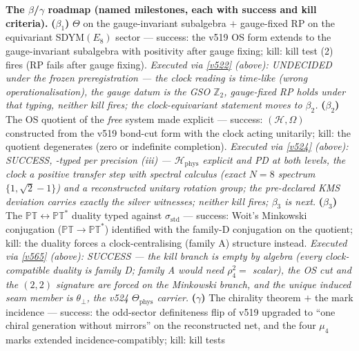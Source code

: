 \documentclass[11pt,a4paper]{article}
\newcommand{\Z}{\mathbb Z}
\begin{document}
\par\smallskip\noindent\textbf{The $\beta$/$\gamma$ roadmap (named milestones, each with success
and kill criteria).}
\textbf{($\beta_1$)} $\Theta$ on the gauge-invariant subalgebra $+$ gauge-fixed RP on the
equivariant SDYM$(E_8)$ sector --- success: the v519 OS form extends to the gauge-invariant
subalgebra with positivity after gauge fixing; kill: kill test (2) fires (RP fails after gauge
fixing). \emph{Executed via \vref{v522} (above): UNDECIDED under the frozen preregistration ---
the clock reading is time-like (wrong operationalisation), the gauge datum is the GSO $\Z_2$,
gauge-fixed RP holds under that typing, neither kill fires; the clock-equivariant statement
moves to $\beta_2$.}
\textbf{($\beta_2$)} The OS quotient of the \emph{free} system made explicit --- success:
$(\mathcal H,\Omega)$ constructed from the v519 bond-cut form with the clock acting unitarily;
kill: the quotient degenerates (zero or indefinite completion). \emph{Executed via
\vref{v524} (above): SUCCESS, \mC-typed per precision (iii) --- $\mathcal H_{\mathrm{phys}}$
explicit and PD at both levels, the clock a positive transfer step with spectral calculus
(exact $N = 8$ spectrum $\{1, \sqrt2-1\}$) and a reconstructed unitary rotation group; the
pre-declared KMS deviation carries exactly the silver witnesses; neither kill fires;
$\beta_3$ is next.}
\textbf{($\beta_3$)} The $\mathbb{PT}\leftrightarrow\mathbb{PT}^*$ duality typed against
$\sigma_{\mathrm{std}}$ --- success: Woit's Minkowski conjugation ($\mathbb{PT}\to\mathbb{PT}^*$)
identified with the family-D conjugation on the quotient; kill: the duality forces a
clock-centralising (family A) structure instead. \emph{Executed via \vref{v565} (above):
SUCCESS --- the kill branch is empty by algebra (every clock-compatible duality is family D;
family A would need $\rho_4^2=$ scalar), the OS cut and the $(2,2)$ signature are forced on
the Minkowski branch, and the unique induced seam member is $\theta_\perp$, the v524
$\Theta_{\mathrm{phys}}$ carrier.}
\textbf{($\gamma$)} The chirality theorem $+$ the mark incidence --- success: the odd-sector
definiteness flip of v519 upgraded to ``one chiral generation without mirrors'' on the
reconstructed net, and the four $\mu_4$ marks extended incidence-compatibly; kill: kill tests
\end{document}
